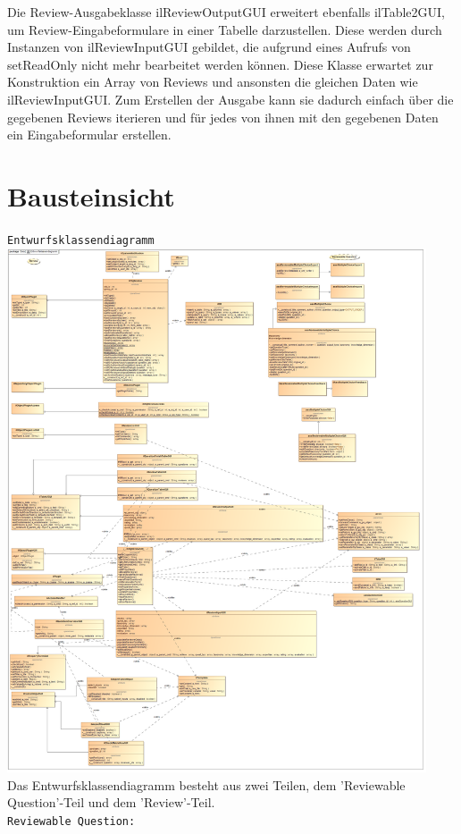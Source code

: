 \documentclass[a4paper]{scrreprt}
\begin{document}
Die Review-Ausgabeklasse ilReviewOutputGUI erweitert ebenfalls ilTable2GUI, um Review-Eingabeformulare in einer Tabelle darzustellen. Diese werden durch Instanzen von ilReviewInputGUI gebildet, die aufgrund eines Aufrufs von setReadOnly nicht mehr bearbeitet werden können. Diese Klasse erwartet zur Konstruktion ein Array von Reviews und ansonsten die gleichen Daten wie ilReviewInputGUI. Zum Erstellen der Ausgabe kann sie dadurch einfach über die gegebenen Reviews iterieren und für jedes von ihnen mit den gegebenen Daten ein Eingabeformular erstellen.\\
\chapter{Bausteinsicht}
\texttt{Entwurfsklassendiagramm}\\
\includegraphics[width=0.93\textwidth]{Class_Diagram__Entwurfsklassendiagramm.png}
\label{Entwurfsklassendiagramm}\\
Das Entwurfsklassendiagramm besteht aus zwei Teilen, dem 'Reviewable Question'-Teil und dem 'Review'-Teil.\\
\texttt{Reviewable Question:}\\
\end{document}
